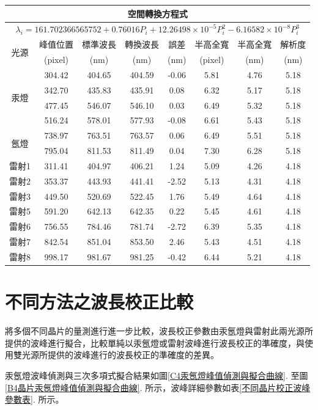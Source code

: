 \begin{center}
	\vspace{0.8cm}
	\label{不同晶片汞氬燈校正結果參數}
\begin{tabularx}{\textwidth}{cccccccc}
	\hline\hline
	\multicolumn{8}{c}{空間轉換方程式}\\
	\hline
	\multicolumn{8}{c}{$\lambda_i = 161.702366565752 + 0.76016P_i + 12.26498\times 10^{-5}P_i^2 -6.16582\times 10^{-8}P_i^3$}\\
	\hline
	\multirow{2}{*}{光源}
	&峰值位置&標準波長&轉換波長&誤差&半高全寬&半高全寬&解析度\\
	&(pixel)&(nm)&(nm)&(nm)&(pixel)&(nm)&(nm)\\
	\hline
	\multirow{4}{*}{汞燈 }
	&304.42&404.65&404.59&-0.06&5.81&4.76&5.18\\
	&342.70&435.83&435.91&0.08&6.32&5.17&5.18\\
	&477.45&546.07&546.10&0.03&6.49&5.32&5.18\\
	&516.24&578.01&577.93&-0.08&6.61&5.43&5.18\\
	\hline
	\multirow{2}{*}{氬燈 }
	&738.97&763.51&763.57&0.06&6.49&5.51&5.18\\
	&795.04&811.53&811.49&0.04&7.30&6.28&5.18\\  
	\hline	
	雷射1&311.41&404.97&406.21&1.24&5.09&4.26&4.18\\
	雷射2&353.37&443.93&441.41&-2.52&5.13&4.31&4.18\\
	雷射3&449.50&520.69&522.45&1.76&5.49&4.64&4.18\\
	雷射5&591.20&642.13&642.35&0.22&5.45&4.61&4.18\\
	雷射6&756.55&784.46&781.74&-2.72&6.39&5.35&4.18\\
	雷射7&842.54&851.04&853.50&2.46&5.43&4.51&4.18\\
	雷射8&998.17&981.67&981.25&-0.42&6.44&5.21&4.18\\
	\hline\hline
\end{tabularx}
\end{center}
\newpage
\section{不同方法之波長校正比較}
將多個不同晶片的量測進行進一步比較，波長校正參數由汞氬燈與雷射此兩光源所提供的波峰進行擬合，比較單純以汞氬燈或雷射波峰進行波長校正的準確度，與使用雙光源所提供的波峰進行的波長校正的準確度的差異。\par
汞氬燈波峰偵測與三次多項式擬合結果如圖\ref{C4汞氬燈峰值偵測與擬合曲線}. 至圖\ref{B4晶片汞氬燈峰值偵測與擬合曲線}. 所示，波峰詳細參數如表\ref{不同晶片校正波峰參數表}. 所示。

